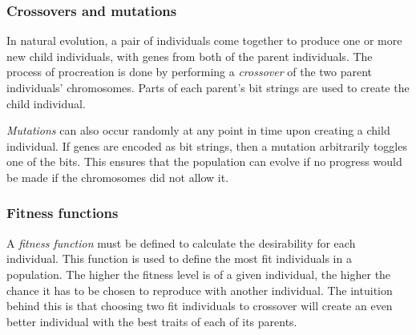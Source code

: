 
\subsubsection{Crossovers and mutations}
In natural evolution, a pair of individuals come together to produce one or more new child individuals, with genes from both of the parent individuals. The process of procreation is done by performing a \emph{crossover} of the two parent individuals' chromosomes. Parts of each parent's bit strings are used to create the child individual.

\emph{Mutations} can also occur randomly at any point in time upon creating a child individual. If genes are encoded as bit strings, then a mutation arbitrarily toggles one of the bits. This ensures that the population can evolve if no progress would be made if the chromosomes did not allow it.

\subsubsection{Fitness functions}
A \emph{fitness function} must be defined to calculate the desirability for each individual. This function is used to define the most fit individuals in a population. The higher the fitness level is of a given individual, the higher the chance it has to be chosen to reproduce with another individual. The intuition behind this is that choosing two fit individuals to crossover will create an even better individual with the best traits of each of its parents.


